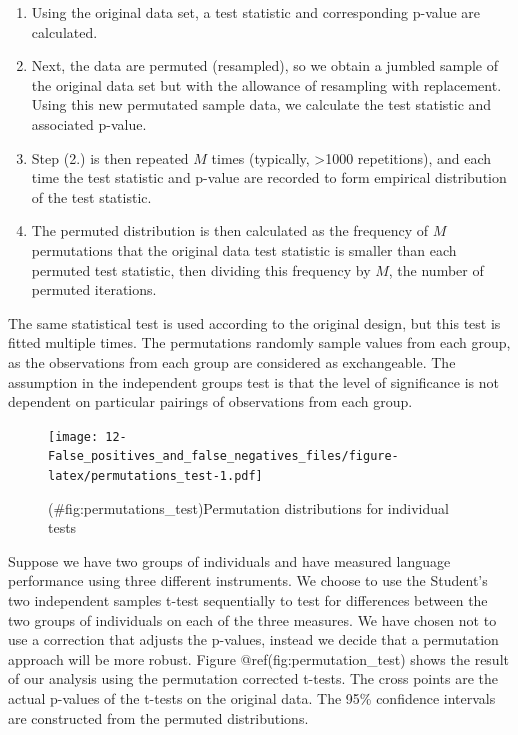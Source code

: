 \documentclass[]{book}
\providecommand{\tightlist}{%
  \setlength{\itemsep}{0pt}\setlength{\parskip}{0pt}}
\begin{document}
\begin{enumerate}
\def\labelenumi{\arabic{enumi}.}
\tightlist
\item
  Using the original data set, a test statistic and corresponding p-value are calculated.
\item
  Next, the data are permuted (resampled), so we obtain a jumbled sample of the original data set but with the allowance of resampling with replacement. Using this new permutated sample data, we calculate the test statistic and associated p-value.
\item
  Step (2.) is then repeated \(M\) times (typically, \textgreater{}1000 repetitions), and each time the test statistic and p-value are recorded to form empirical distribution of the test statistic.
\item
  The permuted distribution is then calculated as the frequency of \(M\) permutations that the original data test statistic is smaller than each permuted test statistic, then dividing this frequency by \(M\), the number of permuted iterations.
\end{enumerate}

The same statistical test is used according to the original design, but this test is fitted multiple times. The permutations randomly sample values from each group, as the observations from each group are considered as exchangeable. The assumption in the independent groups test is that the level of significance is not dependent on particular pairings of observations from each group.

\begin{figure}
\centering
\texttt{[image: 12-False\_positives\_and\_false\_negatives\_files/figure-latex/permutations\_test-1.pdf]}
\caption{(\#fig:permutations\_test)Permutation distributions for individual tests}
\end{figure}

Suppose we have two groups of individuals and have measured language performance using three different instruments. We choose to use the Student's two independent samples t-test sequentially to test for differences between the two groups of individuals on each of the three measures. We have chosen not to use a correction that adjusts the p-values, instead we decide that a permutation approach will be more robust. Figure @ref(fig:permutation\_test) shows the result of our analysis using the permutation corrected t-tests. The cross points are the actual p-values of the t-tests on the original data. The 95\% confidence intervals are constructed from the permuted distributions.
\end{document}
